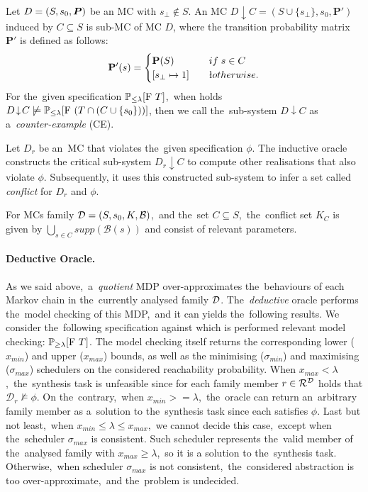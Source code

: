 \begin{definition}
Let $D = (S,s_{0},\boldsymbol{P})$ be an MC with $s_{\bot} \notin S$.
An MC $D \! \downarrow \! C = (S \cup \{ s_{\bot} \}, s_0, \mathbf{P}')$ induced by $C \subseteq S$ is sub-MC of MC $D$, where the transition probability matrix $\mathbf{P}'$ is defined as follows:
\begin{align*}
    \mathbf{P}'(s) = 
    \begin{cases}
        \mathbf{P}(S) \quad & if \; s \in C \\
        [ s_{\bot} \mapsto 1 ] \quad & \l otherwise.  
    \end{cases}
\end{align*}
For the~given specification $\mathbb{P}_{\leq \lambda}[\mathrm{F}\ T]$,~when holds $D \! \downarrow \! C \not \models \mathbb{P}_{\leq \lambda}[\mathrm{F}\ (T \cap (C \cup \{ s_0 \}))]$, then we call the~sub-system $D \! \downarrow \! C$ as a~\textit{counter-example} (CE).
\end{definition}

Let $D_r$ be an~MC that violates the~given specification $\phi$.
The inductive oracle constructs the critical sub-system $D_r \! \downarrow \! C$ to compute other realisations that also violate $\phi$.
Subsequently, it uses this constructed sub-system to infer a set called \textit{conflict} for $D_r$ and $\phi$.

\begin{definition}[Conflict] \label{def:conflict_set}
For MCs family $\mathcal{D} = (S,s_{0},K,\mathcal{B})$,~and the~set $C \subseteq S$,~the~conflict set $K_C$ is given by $\bigcup_{s \in C} supp(\mathcal{B}(s))$ and consist of relevant parameters.
\end{definition}

\paragraph{Deductive Oracle.}
As we said above,~a~\textit{quotient} MDP over-approximates the~behaviours of each Markov chain in the~currently analysed family $\mathcal{D}$.
The~\textit{deductive} oracle performs the~model checking of this MDP,~and it can yields the~following results.
We consider the~following specification against which is performed relevant model checking: $\mathbb{P}_{\geq \lambda}[\mathrm{F}\ T]$.
The model checking itself returns the corresponding lower ($x_{min}$) and upper ($x_{max}$) bounds, as well as the minimising ($\sigma_{min}$) and maximising ($\sigma_{max}$) schedulers on the considered reachability probability.
When $x_{max} < \lambda$,~the~synthesis task is unfeasible since for each family member $r \in \mathcal{R}^{\mathcal{D}}$ holds that $\mathcal{D}_r \not\models \phi$.
On the~contrary,~when $x_{min} >= \lambda$,~the~oracle can return an~arbitrary family member as a~solution to the~synthesis task since each satisfies $\phi$.
Last but not least,~when $x_{min} \leq \lambda \leq x_{max}$,~we cannot decide this case,~except when the~scheduler $\sigma_{max}$ is consistent.
Such scheduler represents the~valid member of the~analysed family with $x_{max} \geq \lambda$,~so it is a solution to the~synthesis task.
Otherwise,~when scheduler $\sigma_{max}$ is not consistent,~the~considered abstraction is too over-approximate,~and the~problem is undecided.


